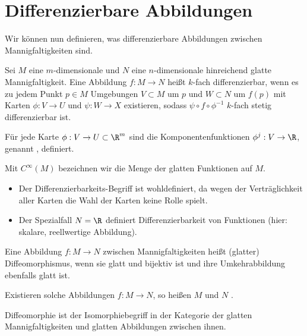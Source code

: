 \chapter{Differenzierbare Abbildungen}


Wir können nun definieren, was differenzierbare Abbildungen zwischen Mannigfaltigkeiten sind.

\begin{df} \label{2.1}
    Sei $M$ eine $m$-dimensionale und $N$ eine $n$-dimensionale hinreichend glatte Mannigfaltigkeit.
    Eine Abbildung $f: M \to N$ heißt $k$-fach differenzierbar, wenn es zu jedem Punkt $p \in M$ Umgebungen $V \subset M$ um $p$ und $W \subset N$ um $f(p)$ mit Karten $\phi: V \to U$ und $\psi: W \to X$ existieren, sodass
    \begin{math}
        \psi \circ f \circ \phi^{-1}
    \end{math}
    $k$-fach stetig differenzierbar ist.

    Für jede Karte $\phi: V \to U \subset \R^m$ sind die Komponentenfunktionen $\phi^j: V \to \R$, genannt , definiert.

    Mit $C^\infty(M)$ bezeichnen wir die Menge der glatten Funktionen auf $M$.
    \begin{note}
        \begin{itemize}
            \item
                Der Differenzierbarkeits-Begriff ist wohldefiniert, da wegen der Verträglichkeit aller Karten die Wahl der Karten keine Rolle spielt.
            \item
                Der Spezialfall $N = \R$ definiert Differenzierbarkeit von Funktionen (hier: skalare, reellwertige Abbildung).
        \end{itemize}
    \end{note}
\end{df}

\begin{df} \label{2.2}
    Eine Abbildung $f: M \to N$ zwischen Mannigfaltigkeiten heißt (glatter) Diffeomorphismus, wenn sie glatt und bijektiv ist und ihre Umkehrabbildung ebenfalls glatt ist.

    Existieren solche Abbildungen $f: M \to N$, so heißen $M$ und $N$ .
    \begin{note}
        Diffeomorphie ist der Isomorphiebegriff in der Kategorie der glatten Mannigfaltigkeiten und glatten Abbildungen zwischen ihnen.
    \end{note}
\end{df}

